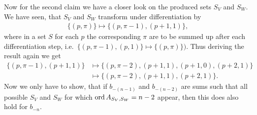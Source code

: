 \begin{Remark}
\begin{Proof}
    Now for the second claim we have a closer look on the produced sets $S_V$
    and $S_W$. We have seen, that $S_V$ and $S_W$ transform under
    differentiation by
    \begin{align*}
      \{(p,\pi)\} \mapsto \{(p,\pi-1),(p+1,1)\},
    \end{align*}
    where in a set $S$ for each $p$ the corresponding $\pi$ are to be summed up
    after each differentiation step, i.e.\
    $\{(p,\pi-1),(p,1)\}\mapsto\{(p,\pi)\})$. Thus deriving the result again we
    get
    \begin{align*}
      \{(p,\pi-1), (p+1,1)\} &\mapsto \{(p,\pi-2),(p+1,1),(p+1,0),(p+2,1)\} \\
                             &\mapsto \{(p,\pi-2), (p+1,1), (p+2,1)\}.
    \end{align*}
    Now we only have to show, that if $b_{-(n-1)}$ and $b_{-(n-2)}$ are sums
    such that all possible $S_V$ and $S_W$ for which $\operatorname{ord} A_{S_V,S_W} = n-2$
    appear, then this does also hold for $b_{-n}$.
  \end{Proof}
\end{Remark}
